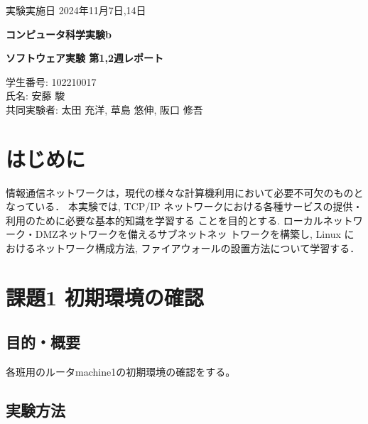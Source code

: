 \documentclass{ltjsarticle} %
\begin{document}
\thispagestyle{empty}
\begin{flushright}
{\large 実験実施日 2024年11月7日,14日{\hspace{5cm}}} 
\end{flushright}

\vspace*{\fill}
\centering
{\Huge\bf コンピュータ科学実験b}
\vspace*{1cm}

{\huge\bf ソフトウェア実験 第1,2週レポート}
\vspace*{\fill}

\vspace*{\fill}

\vspace*{\fill}

\begin{flushright}
{\large 学生番号: 102210017} \\ %
{\large 氏名: 安藤 駿} \\

{\large 共同実験者: 太田 充洋, 草島 悠伸, 阪口 修吾} \\
\end{flushright}

\clearpage

\addtocounter{page}{-1}
\raggedright
\setlength{\parindent}{1em}

\section{はじめに}
情報通信ネットワークは，現代の様々な計算機利用において必要不可欠のものとなっている．
本実験では, TCP/IP ネットワークにおける各種サービスの提供・利用のために必要な基本的知識を学習する
ことを目的とする. ローカルネットワーク・DMZネットワークを備えるサブネットネッ
トワークを構築し, Linux におけるネットワーク構成方法, ファイアウォールの設置方法について学習する．


\section{課題1 初期環境の確認}

\subsection{目的・概要}
各班用のルータmachine1の初期環境の確認をする。


\subsection{実験方法}
\end{document}

